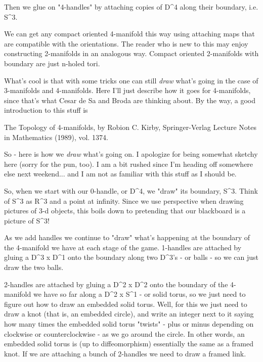 Then we glue on "4-handles" by attaching copies of D^4 along their
boundary, i.e. S^3.

We can get any compact oriented 4-manifold this way using attaching maps
that are compatible with the orientations.  The reader who is new to this
may enjoy constructing 2-manifolds in an analogous way.  Compact
oriented 2-manifolds with boundary are just n-holed tori.

What's cool is that with some tricks one can still \emph{draw} what's going in
the case of 3-manifolds and 4-manifolds.  Here I'll just describe how it
goes for 4-manifolds, since that's what Cesar de Sa and Broda are
thinking about.  By the way, a good introduction to this stuff is 

The Topology of 4-manifolds, by Robion C. Kirby, Springer-Verlag
Lecture Notes in Mathematics (1989), vol. 1374.

So - here is how we \emph{draw} what's going on.  I apologize for being
somewhat sketchy here (sorry for the pun, too).  I am a bit
rushed since I'm heading off somewhere else next weekend... and I am not
as familiar with this stuff as I should be.

So, when we start with our 0-handle, or D^4, we "draw" its boundary,
S^3.  Think of S^3 as R^3 and a point at infinity.  Since we use perspective
when drawing pictures of 3-d objects, this boils down to pretending that
our blackboard is a picture of S^3!  

As we add handles we continue to "draw" what's happening at the
boundary of the 4-manifold we have at each stage of the game.  1-handles
are attached by gluing a D^3 x D^1 onto the boundary along two D^3's -
or balls - so we can just draw the two balls. 

2-handles are attached by gluing a D^2 x D^2 onto the boundary of the
4-manifold we have so far along a D^2 x S^1 - or solid torus, so we just
need to figure out how to draw an embedded solid torus.   Well, for this
we just need to draw a knot (that is, an embedded circle), and write an
integer next to it saying how many times the embedded solid torus
"twists" - plus or minus depending on clockwise or counterclockwise - as
we go around the circle.  In other words, an embedded solid torus is (up
to diffeomorphism) essentially the same as a framed knot.  If we are
attaching a bunch of 2-handles we need to draw a framed link.

